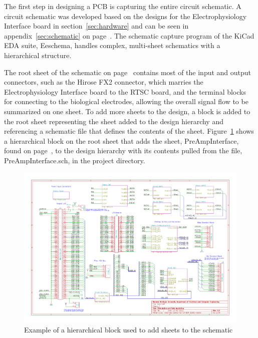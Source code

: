 The first step in designing a PCB is capturing the entire circuit schematic.  A circuit schematic was developed based on the designs for the Electrophysiology Interface board in section~\ref{sec:hardware} and can be seen in appendix~\ref{sec:schematic} on page~\pageref{sec:schematic}.  The schematic capture program of the KiCad EDA suite, Eeschema, handles complex, multi-sheet schematics with a hierarchical structure.

The root sheet of the schematic on page~\pageref{SchematicRev1r0.1} contains most of the input and output connectors, such as the Hirose FX2 connector, which marries the Electrophysiology Interface board to the RTSC board, and the terminal blocks for connecting to the biological electrodes, allowing the overall signal flow to be summarized on one sheet.  To add more sheets to the design, a block is added to the root sheet representing the sheet added to the design hierarchy and referencing a schematic file that defines the contents of the sheet.  Figure~\ref{fig:hblock} shows a hierarchical block on the root sheet that adds the sheet, PreAmpInterface, found on page~\pageref{SchematicRev1r0.2}, to the design hierarchy with its contents pulled from the file, PreAmpInterface.sch, in the project directory.

\begin{figure}[h]
	\begin{singlespace}
	\centering
	\includegraphics[page=1,trim=6.4in 3.7in 2.6in 2.8in,clip]{./figures/SchematicRev1r0} %
	\caption{Example of a hierarchical block used to add sheets to the schematic\label{fig:hblock}}
	\end{singlespace}
\end{figure}

